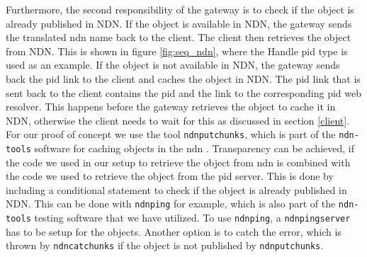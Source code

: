 Furthermore, the second responsibility of the gateway is to check if the object is already published in NDN.
If the object is available in NDN, the gateway sends the translated \gls{ndn} name back to the client. The client then retrieves the object from NDN. This is shown in figure \ref{fig:seq_ndn}, where the Handle \gls{pid} type is used as an example. If the object is not available in NDN, the gateway sends back the \gls{pid} link to the client and caches the object in NDN. 
The \gls{pid} link that is sent back to the client contains the \gls{pid} and the link to the corresponding \gls{pid} web resolver. This happens before the gateway retrieves the object to cache it in NDN, otherwise the client needs to wait for this as discussed in section \ref{client}. For our proof of concept we use the tool \texttt{ndnputchunks}, which is part of the \texttt{ndn-tools} software for caching objects in the \gls{ndn} \cite{ndn-tools}. Transparency can be achieved, if the code we used in our setup to retrieve the object from \gls{ndn} is combined with the code we used to retrieve the object from the \gls{pid} server. This is done by including a conditional statement to check if the object is already published in NDN. This can be done with \texttt{ndnping} for example, which is also part of the \texttt{ndn-tools} testing software that we have utilized. To use \texttt{ndnping}, a \texttt{ndnpingserver} has to be setup for the objects. Another option is to catch the error, which is thrown by \texttt{ndncatchunks} if the object is not published by \texttt{ndnputchunks}. 
